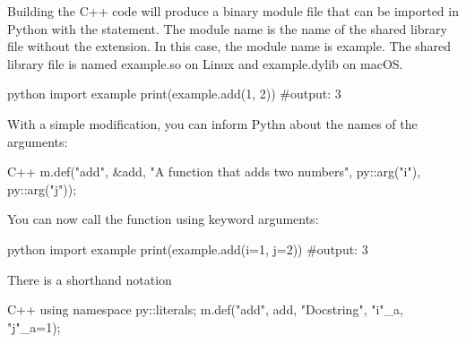 
Building the C++ code will produce a binary module file that can be imported in Python with the  statement. The module name is the name of the shared library file without the extension. In this case, the module name is example. The shared library file is named example.so on Linux and example.dylib on macOS.

\begin{neonlisting}{python}
    import example
    print(example.add(1, 2)) #output: 3
\end{neonlisting}

With a simple modification, you can inform Pythn about the names of the arguments:

\begin{neonlisting}[language=C++]{C++}
    m.def("add", &add, "A function that adds two numbers", 
    py::arg("i"), py::arg("j"));
\end{neonlisting}

You can now call the function using keyword arguments:

\begin{neonlisting}{python}
    import example
    print(example.add(i=1, j=2)) #output: 3
\end{neonlisting}


There is a shorthand notation 

\begin{neonlisting}[language=C++]{C++}
    using namespace py::literals;
    m.def("add", add, "Docstring", "i"_a, "j"_a=1);
\end{neonlisting}

